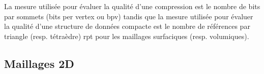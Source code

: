 La mesure utilisée pour évaluer la qualité d'une compression est le nombre de bits par sommets (bits per vertex ou bpv) tandis que la mesure utilisée pour évaluer la qualité d'une structure de données compacte est le nombre de références par triangle (resp. tétraèdre) rpt pour les maillages surfaciques (resp. volumiques).
\subsection{Maillages 2D}
